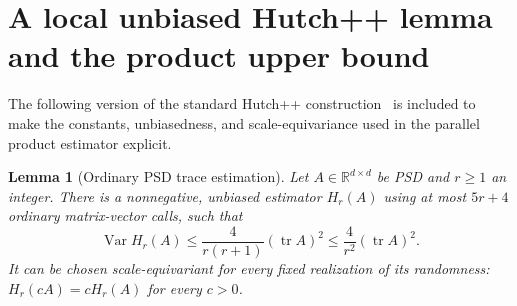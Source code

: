 \documentclass[11pt]{article}
\newtheorem{lemma}[theorem]{Lemma}
\theoremstyle{definition}\newtheorem{definition}[theorem]{Definition}
\theoremstyle{remark}\newtheorem{remark}[theorem]{Remark}
\newcommand{\R}{\mathbb R}\newcommand{\C}{\mathbb C}
\newcommand{\tr}{\operatorname{tr}}\newcommand{\rank}{\operatorname{rank}}
\newcommand{\Var}{\operatorname{Var}}\newcommand{\Cov}{\operatorname{Cov}}
\begin{document}
\section{A local unbiased Hutch++ lemma and the product upper bound}
\label{sec:hutch}

The following version of the standard Hutch++ construction~\cite{hutchpp} is
included to make the constants, unbiasedness, and scale-equivariance used in the
parallel product estimator explicit.

\begin{lemma}[Ordinary PSD trace estimation]\label{lem:hutch}
Let $A\in\R^{d\times d}$ be PSD and $r\ge1$ an integer. There is a nonnegative,
unbiased estimator $H_r(A)$ using at most $5r+4$ ordinary matrix-vector calls,
such that
\begin{equation}\label{eq:hutchvar}
 \Var H_r(A)\le\frac4{r(r+1)}(\tr A)^2
              \le\frac4{r^2}(\tr A)^2.
\end{equation}
It can be chosen scale-equivariant for every fixed realization of its randomness:
$H_r(cA)=cH_r(A)$ for every $c>0$.
\end{lemma}
\end{document}
